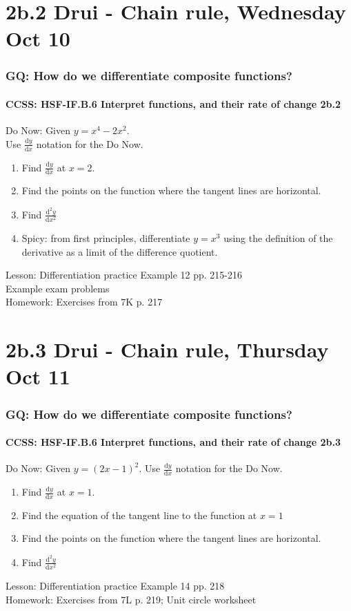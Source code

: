 \documentclass{beamer}
\begin{document}
\section{2b.2 Drui - Chain rule, Wednesday Oct 10}
  \frame
  {
    \frametitle{GQ: How do we differentiate composite functions?}
    \framesubtitle{CCSS: HSF-IF.B.6 Interpret functions, and their rate of change  \alert{2b.2}}

    \begin{block}{Do Now: Given $y= x^4-2x^2$. \\Use $\frac{\mathrm{d}y}{\mathrm{d}x}$ notation for the Do Now.}
      \begin{enumerate}
      \item Find $\frac{\mathrm{d}y}{\mathrm{d}x}$ at $x=2$.
      \item Find the points on the function where the tangent lines are horizontal.
      \item Find $\frac{\mathrm{d}^2y}{\mathrm{d}x^2}$
      \item Spicy: from first principles, differentiate $y=x^3$ using the definition of the derivative as a limit of the difference quotient.
      \end{enumerate}
   \end{block}
    Lesson: Differentiation practice Example 12 pp. 215-216\\
    Example exam problems\\ \bigskip
    Homework: Exercises from 7K p. 217
  }

\section{2b.3 Drui - Chain rule, Thursday Oct 11}
  \frame
  {
    \frametitle{GQ: How do we differentiate composite functions?}
    \framesubtitle{CCSS: HSF-IF.B.6 Interpret functions, and their rate of change  \alert{2b.3}}

    \begin{block}{Do Now: Given $y= (2x-1)^2$. Use $\frac{\mathrm{d}y}{\mathrm{d}x}$ notation for the Do Now.}
      \begin{enumerate}
      \item Find $\frac{\mathrm{d}y}{\mathrm{d}x}$ at $x=1$.
      \item Find the equation of the tangent line to the function at $x=1$
      \item Find the points on the function where the tangent lines are horizontal.
      \item Find $\frac{\mathrm{d}^2y}{\mathrm{d}x^2}$
      \end{enumerate}
   \end{block}
    Lesson: Differentiation practice Example 14 pp. 218\\
    \bigskip
    Homework: Exercises from 7L p. 219; Unit circle worksheet
  }
\end{document}
